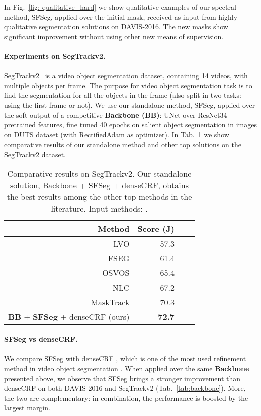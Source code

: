\documentclass{article}
\begin{document}
In Fig.~\ref{fig: qualitative_hard} we show qualitative examples of our spectral method, SFSeg, applied over the initial mask, received as input from highly qualitative segmentation solutions on DAVIS-2016. The new masks show significant improvement without using other new means of supervision.


\paragraph{Experiments on SegTrackv2.} SegTrackv2~\cite{segtrack2} is a video object segmentation dataset, containing 14 videos, with multiple objects per frame. The purpose for video object segmentation task is to find the segmentation for all the objects in the frame (also split in two tasks: using the first frame or not). We use our standalone method, SFSeg, applied over the soft output of a competitive \textbf{Backbone (BB)}: UNet over ResNet34 pretrained features, fine tuned 40 epochs on salient object segmentation in images on DUTS dataset \cite{saliencyDS} (with RectifiedAdam as optimizer). In Tab.~\ref{tab:segtrack2} we show comparative results of our standalone method and other top solutions on the SegTrackv2 dataset. 



\begin{table}[t]
\begin{center}
	\begin{tabular}{r r r r}
		\toprule
		\multicolumn{1}{r}{Method} &
        \multicolumn{1}{r}{Score (J)}\\
        \midrule
        LVO & 57.3\\
        FSEG & 61.4\\
		OSVOS & 65.4\\
		NLC  & 67.2\\
		MaskTrack & 70.3\\
		\textbf{BB} + \textbf{SFSeg} + denseCRF (ours)& \textbf{72.7} \\
        \bottomrule
    \end{tabular}
\end{center}			
\caption{Comparative results on SegTrackv2. Our standalone solution, Backbone + SFSeg + denseCRF, obtains the best results among the other top methods in the literature. Input methods: \protect\cite{lvo,fseg,osvos,nlc,masktrack}.}
\label{tab:segtrack2}
\end{table}


\paragraph{SFSeg vs denseCRF.} We compare SFSeg with denseCRF \cite{denseCRF}, which is one of the most used refinement method in video object segmentation \cite{pdb}. When applied over the same \textbf{Backbone} presented above, we observe that SFSeg brings a stronger improvement than denseCRF on both DAVIS-2016 and SegTrackv2 (Tab.~\ref{tab:backbone}). More, the two are complementary: in combination, the performance is boosted by the largest margin.
\end{document}
